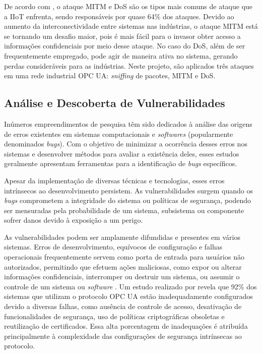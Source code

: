         De acordo com \cite{cekerevac2017}, o ataque MITM e DoS são os tipos mais comuns de ataque que a IIoT enfrenta, sendo responsáveis por quase 64\% dos ataques. Devido ao aumento da interconectividade entre sistemas nas indústrias, o ataque MITM está se tornando um desafio maior, pois é mais fácil para o invasor obter acesso a informações confidenciais por meio desse ataque. No caso do DoS, além de ser frequentemente empregado, pode agir de maneira ativa no sistema, gerando perdas consideráveis para as indústrias. Neste projeto, são aplicados três ataques em uma rede industrial OPC UA: \textit{sniffing} de pacotes, MITM e DoS.
        

    \subsection{Análise e Descoberta de Vulnerabilidades} \label{subsec:analVul}

        Inúmeros empreendimentos de pesquisa têm sido dedicados à análise das origens de erros existentes em sistemas computacionais e \textit{softwares} (popularmente denominados \textit{bugs}). Com o objetivo de minimizar a ocorrência desses erros nos sistemas e desenvolver métodos para avaliar a existência deles, esses estudos geralmente apresentam ferramentas para a identificação de \textit{bugs} específicos.

        Apesar da implementação de diversas técnicas e tecnologias, esses erros intrínsecos ao desenvolvimento persistem. As vulnerabilidades surgem quando os \textit{bugs} comprometem a integridade do sistema ou políticas de segurança, podendo ser mensuradas pela probabilidade de um sistema, subsistema ou componente sofrer danos devido à exposição a um perigo.
        
        As vulnerabilidades podem ser amplamente difundidas e presentes em vários sistemas. Erros de desenvolvimento, equívocos de configuração e falhas operacionais frequentemente servem como porta de entrada para usuários não autorizados, permitindo que efetuem ações maliciosas, como expor ou alterar informações confidenciais, interromper ou destruir um sistema, ou assumir o controle de um sistema ou \textit{software} \cite{dowd2006}. Um estudo realizado por  revela que 92\% dos sistemas que utilizam o protocolo OPC UA estão inadequadamente configurados devido a diversas falhas, como ausência de controle de acesso, desativação de funcionalidades de segurança, uso de políticas criptográficas obsoletas e reutilização de certificados. Essa alta porcentagem de inadequações é atribuída principalmente à complexidade das configurações de segurança intrínsecas ao protocolo.
        
